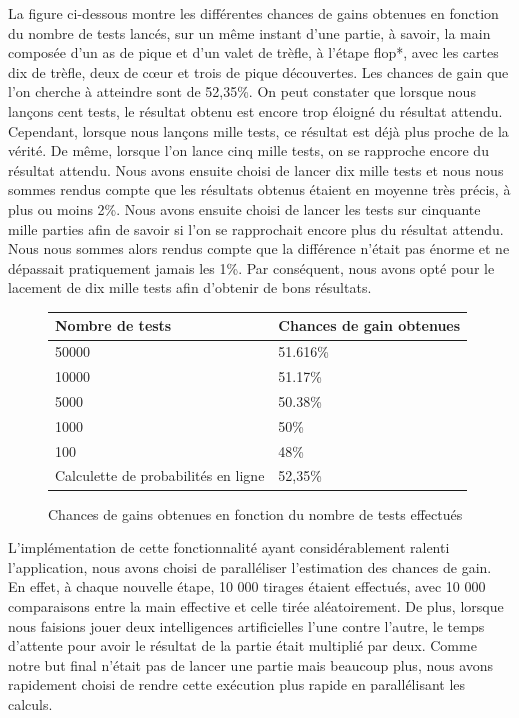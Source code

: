 \documentclass{report}
\begin{document}
La figure ci-dessous montre les différentes chances de gains obtenues en fonction du nombre de tests lancés, sur un même instant d'une partie, à savoir, la main composée d'un as de pique et d'un valet de trèfle, à l'étape flop*, avec les cartes dix de trèfle, deux de cœur et trois de pique découvertes. Les chances de gain que l'on cherche à atteindre sont de 52,35\%. On peut constater que lorsque nous lançons cent tests, le résultat obtenu est encore trop éloigné du résultat attendu. Cependant, lorsque nous lançons mille tests, ce résultat est déjà plus proche de la vérité. De même, lorsque l'on lance cinq mille tests, on se rapproche encore du résultat attendu. Nous avons ensuite choisi de lancer dix mille tests et nous nous sommes rendus compte que les résultats obtenus étaient en moyenne très précis, à plus ou moins 2\%. Nous avons ensuite choisi de lancer les tests sur cinquante mille parties afin de savoir si l'on se rapprochait encore plus du résultat attendu. Nous nous sommes alors rendus compte que la différence n'était pas énorme et ne dépassait pratiquement jamais les 1\%. Par conséquent, nous avons opté pour le lacement de dix mille tests afin d'obtenir de bons résultats.\\

\begin{figure}[H]
\begin{center}
\begin{tabular}{|l|l|}
\hline
Nombre de tests & Chances de gain obtenues\\
\hline
50000  & 51.616\%\\
\hline
10000 & 51.17\%\\
\hline
5000 & 50.38\%\\
\hline
1000 & 50\%\\
\hline
100 & 48\%\\
\hline
Calculette de probabilités en ligne & 52,35\%\\
\hline
\end{tabular}
\end{center}
\caption{Chances de gains obtenues en fonction du nombre de tests effectués}
\end{figure}


L'implémentation de cette fonctionnalité ayant considérablement ralenti l'application, nous avons choisi de paralléliser l'estimation des chances de gain. En effet, à chaque nouvelle étape, 10 000 tirages étaient effectués, avec 10 000 comparaisons entre la main effective et celle tirée aléatoirement. De plus, lorsque nous faisions jouer deux intelligences artificielles l'une contre l'autre, le temps d'attente pour avoir le résultat de la partie était multiplié par deux. Comme notre but final n'était pas de lancer une partie mais beaucoup plus, nous avons rapidement choisi de rendre cette exécution plus rapide en parallélisant les calculs.\par
\end{document}
